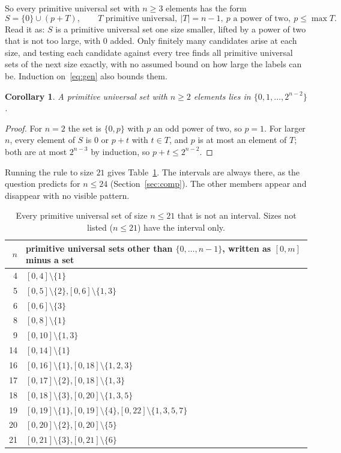 \documentclass[11pt]{article}
\newtheorem{corollary}[theorem]{Corollary}
\theoremstyle{remark}
\begin{document}
So every primitive universal set with $n\ge3$ elements has the form
\begin{equation}\label{eq:gen}
S=\{0\}\cup(p+T),\qquad T \text{ primitive universal},\ |T|=n-1,\ p \text{ a power of two},\ p\le\max T.
\end{equation}
Read it as: $S$ is a primitive universal set one size smaller, lifted by a power of two that is
not too large, with $0$ added. Only finitely many candidates arise at each size, and testing each
candidate against every tree finds all primitive universal sets of the next size exactly, with no
assumed bound on how large the labels can be. Induction on~\eqref{eq:gen} also bounds them.

\begin{corollary}\label{cor:span}
A primitive universal set with $n\ge2$ elements lies in $\{0,1,\dots,2^{n-2}\}$.
\end{corollary}

\begin{proof}
For $n=2$ the set is $\{0,p\}$ with $p$ an odd power of two, so $p=1$. For larger $n$, every
element of $S$ is $0$ or $p+t$ with $t\in T$, and $p$ is at most an element of $T$; both are at
most $2^{n-3}$ by induction, so $p+t\le2^{n-2}$.
\end{proof}

Running the rule to size $21$ gives Table~\ref{tab:univ}. The intervals are always there, as the
question predicts for $n\le24$ (Section~\ref{sec:comp}). The other members appear and disappear
with no visible pattern.

\begin{table}[ht]
\centering
\begin{tabular}{rl}
\toprule
$n$ & primitive universal sets other than $\{0,\dots,n-1\}$, written as $[0,m]$ minus a set\\
\midrule
4 & $[0,4]\setminus\{1\}$\\
5 & $[0,5]\setminus\{2\}$,\quad $[0,6]\setminus\{1,3\}$\\
6 & $[0,6]\setminus\{3\}$\\
8 & $[0,8]\setminus\{1\}$\\
9 & $[0,10]\setminus\{1,3\}$\\
14 & $[0,14]\setminus\{1\}$\\
16 & $[0,16]\setminus\{1\}$,\quad $[0,18]\setminus\{1,2,3\}$\\
17 & $[0,17]\setminus\{2\}$,\quad $[0,18]\setminus\{1,3\}$\\
18 & $[0,18]\setminus\{3\}$,\quad $[0,20]\setminus\{1,3,5\}$\\
19 & $[0,19]\setminus\{1\}$,\quad $[0,19]\setminus\{4\}$,\quad $[0,22]\setminus\{1,3,5,7\}$\\
20 & $[0,20]\setminus\{2\}$,\quad $[0,20]\setminus\{5\}$\\
21 & $[0,21]\setminus\{3\}$,\quad $[0,21]\setminus\{6\}$\\
\bottomrule
\end{tabular}
\caption{Every primitive universal set of size $n\le21$ that is not an interval. Sizes not listed
($n\le21$) have the interval only.}
\label{tab:univ}
\end{table}
\end{document}

